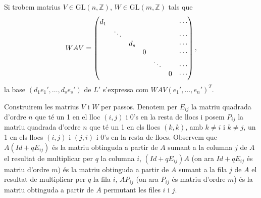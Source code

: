 \documentclass[../main.tex]{subfiles}
\begin{document}
Si trobem matrius $V\in\text{GL}(n,\mathbb{Z})$, $W\in \text{GL}(m,\mathbb{Z})$ tals que
\begin{equation}
    \notag
    WAV = 
    \begin{pmatrix}
        d_1 &        &     &     &     &     & \cdots \\
            & \ddots &     &     &     &     & \cdots \\
            &        & d_s &     &     &     & \cdots \\
            &        &     &  0  &     &     & \cdots \\
            &        &     &     & \ddots &  & \cdots \\
            &        &     &     &     &  0  & \cdots
    \end{pmatrix},
\end{equation}
la base $(d_1e_1',\ldots,d_se_s')$ de $L'$ s'expressa com $WAV(e_1',\ldots,e_n')^T$.

Construirem les matrius $V$ i $W$ per passos. Denotem per $E_{ij}$ la matriu quadrada d'ordre $n$ que té un 1 en el lloc $(i,j)$ i 0's en la resta de llocs i posem $P_{ij}$ la matriu quadrada d'ordre $n$ que té un 1 en els llocs $(k,k)$, amb $k\not=i$ i $k\not=j$, un 1 en els llocs $(i,j)$ i $(j,i)$ i 0's en la resta de llocs. Observem que $A(Id+qE_{ij})$ és la matriu obtinguda a partir de $A$ sumant a la columna $j$ de $A$ el resultat de multiplicar per $q$ la columna $i$, $(Id+qE_{ij})A$ (on ara $Id+qE_{ij}$ és matriu d'ordre $m$) és la matriu obtinguda a partir de $A$ sumant a la fila $j$ de $A$ el resultat de multiplicar per $q$ la fila $i$, $AP_{ij}$ (on ara $P_{ij}$ és matriu d'ordre $m$) és la matriu obtinguda a partir de $A$ permutant les files $i$ i $j$.
\end{document}
